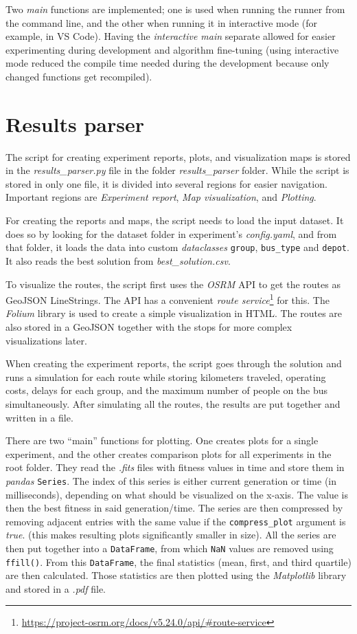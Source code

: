 Two \textit{main} functions are implemented; one is used when running the runner from the command line, and the other when running it in interactive mode (for example, in VS Code). Having the \textit{interactive main} separate allowed for easier experimenting during development and algorithm fine-tuning (using interactive mode reduced the compile time needed during the development because only changed functions get recompiled).

\section{Results parser}

The script for creating experiment reports, plots, and visualization maps is stored in the \textit{results\_parser.py} file in the folder \textit{results\_parser} folder. While the script is stored in only one file, it is divided into several regions for easier navigation. Important regions are \textit{Experiment report}, \textit{Map visualization}, and \textit{Plotting}.

For creating the reports and maps, the script needs to load the input dataset. It does so by looking for the dataset folder in experiment's \textit{config.yaml}, and from that folder, it loads the data into custom \textit{dataclasses} \texttt{group}, \texttt{bus\_type} and \texttt{depot}. It also reads the best solution from \textit{best\_solution.csv}.

To visualize the routes, the script first uses the \textit{OSRM} API to get the routes as GeoJSON LineStrings. The API has a convenient \textit{route service}\footnote{\url{https://project-osrm.org/docs/v5.24.0/api/\#route-service}} for this. The \textit{Folium} library is used to create a simple visualization in HTML. The routes are also stored in a GeoJSON together with the stops for more complex visualizations later.

When creating the experiment reports, the script goes through the solution and runs a simulation for each route while storing kilometers traveled, operating costs, delays for each group, and the maximum number of people on the bus simultaneously. After simulating all the routes, the results are put together and written in a file.

There are two ``main'' functions for plotting. One creates plots for a single experiment, and the other creates comparison plots for all experiments in the root folder. They read the \textit{.fits} files with fitness values in time and store them in \textit{pandas} \texttt{Series}. The index of this series is either current generation or time (in milliseconds), depending on what should be visualized on the x-axis. The value is then the best fitness in said generation/time. The series are then compressed by removing adjacent entries with the same value if the \texttt{compress\_plot} argument is \textit{true}. (this makes resulting plots significantly smaller in size). All the series are then put together into a \texttt{DataFrame}, from which \texttt{NaN} values are removed using \texttt{ffill()}. From this \texttt{DataFrame}, the final statistics (mean, first, and third quartile) are then calculated. Those statistics are then plotted using the \textit{Matplotlib} library and stored in a \textit{.pdf} file.